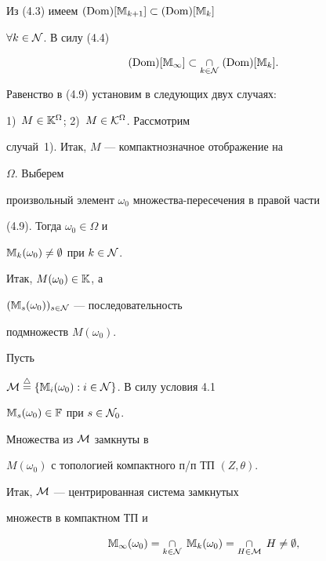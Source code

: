 \begin{pf}


Из (4.3) имеем $(\operatorname{Dom})[{\Bbb M}_{k+1}] \subset (\operatorname{Dom})[{\Bbb M}_k]$


$\forall{k} \in {\cal N}$. В силу (4.4)


\begin{equation}


(\Dom)[{\Bbb M}_\infty] \subset \mathop{\cap}\limits_{k \in {\cal N}}\;


(\Dom)[{\Bbb M}_k].


\end{equation}


Равенство в (4.9) установим в следующих двух случаях:


1)~$M \in {{\Bbb K}^\Omega}$; 2)~$M \in {{\cal K}^\Omega}$. Рассмотрим


случай~1). Итак, $M$ --- компактнозначное отображение на


$\Omega$. Выберем


произвольный элемент ${\omega}_0$ множества-пересечения в правой части


(4.9). Тогда ${{\omega}_0} \in \Omega$ и


${{{\Bbb M}_k}({\omega}_0)} \ne \emptyset$ при $k \in {\cal N}$.


Итак, $M({\omega}_0) \in {\Bbb K}$, а


$({{\Bbb M}_s}({\omega}_0))_{s \in {\cal N}}$ --- последовательность


подмножеств $M({\omega}_0)$.


Пусть


${\cal M}\stac \{{{{\Bbb M}_i}({\omega}_0)}: i \in


{\cal N}\}$. В силу условия 4.1


${{{\Bbb M}_s}({\omega}_0)} \in {\Bbb F}$ при $s \in {{\cal N}_0}$.


Множества из ${\cal M}$ замкнуты в


$M({\omega}_0)$ с топологией компактного п/п ТП $(Z,\theta)$.


Итак, ${\cal M}$ --- центрированная система замкнутых


множеств в компактном ТП и


$$


{{\Bbb M}_\infty}({\omega}_0) = \mathop{\cap}\limits_{k \in {\cal N}}\;


{{{\Bbb M}_k}({\omega}_0)} = \mathop{\cap}\limits_{H \in {\cal M}}\; H


\ne \emptyset,


$$



\end{pf}
